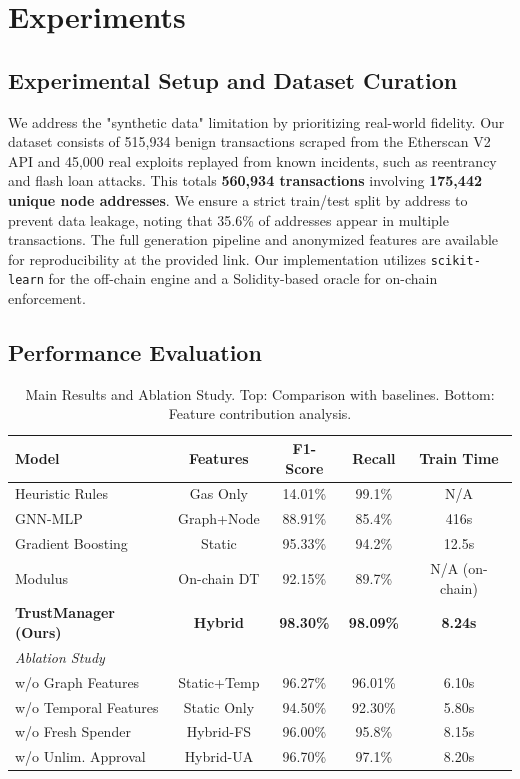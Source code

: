 \documentclass[runningheads]{llncs}
\begin{document}
\section{Experiments}

\subsection{Experimental Setup and Dataset Curation}
We address the "synthetic data" limitation by prioritizing real-world fidelity. Our dataset consists of 515,934 benign transactions scraped from the Etherscan V2 API and 45,000 real exploits replayed from known incidents, such as reentrancy and flash loan attacks. This totals \textbf{560,934 transactions} involving \textbf{175,442 unique node addresses}. We ensure a strict train/test split by address to prevent data leakage, noting that 35.6\% of addresses appear in multiple transactions. The full generation pipeline and anonymized features are available for reproducibility at the provided link. Our implementation utilizes \texttt{scikit-learn} for the off-chain engine and a Solidity-based oracle for on-chain enforcement.

\subsection{Performance Evaluation}

\begin{table}[htbp]
\centering
\caption{Main Results and Ablation Study. Top: Comparison with baselines. Bottom: Feature contribution analysis.}
\label{tab:main_results}
\begin{tabular}{lcccc}
\toprule
\textbf{Model} & \textbf{Features} & \textbf{F1-Score} & \textbf{Recall} & \textbf{Train Time} \\
\midrule
Heuristic Rules & Gas Only & 14.01\% & 99.1\% & N/A \\
GNN-MLP \cite{wu2020comprehensive} & Graph+Node & 88.91\% & 85.4\% & 416s \\
Gradient Boosting & Static & 95.33\% & 94.2\% & 12.5s \\
Modulus \cite{modulus2023cost} & On-chain DT & 92.15\% & 89.7\% & N/A (on-chain) \\
\textbf{TrustManager (Ours)} & \textbf{Hybrid} & \textbf{98.30\%} & \textbf{98.09\%} & \textbf{8.24s} \\
\midrule
\multicolumn{5}{l}{\textit{Ablation Study}} \\
w/o Graph Features & Static+Temp & 96.27\% & 96.01\% & 6.10s \\
w/o Temporal Features & Static Only & 94.50\% & 92.30\% & 5.80s \\
w/o Fresh Spender & Hybrid-FS & 96.00\% & 95.8\% & 8.15s \\
w/o Unlim. Approval & Hybrid-UA & 96.70\% & 97.1\% & 8.20s \\
\bottomrule
\end{tabular}
\end{table}
\end{document}
